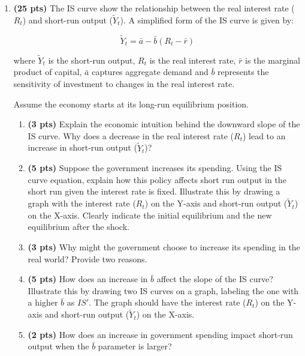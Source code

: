 \documentclass[14pt, oneside]{memoir}
\begin{document}
\begin{enumerate}[label=\textbf{\arabic*.}, itemsep=15pt]
\newpage

\item  \textbf{(25 pts)}\label{P4} The IS curve show the relationship between the real interest rate (\( R_t \)) and short-run output (\( \tilde{Y}_t \)). A simplified form of the IS curve is given by:

\[
\tilde{Y}_t = \bar{a} - \bar{b} (R_t - \bar{r})
\]

where \( \tilde{Y}_t \) is the short-run output, \( R_t \) is the real interest rate, \( \bar{r} \) is the marginal product of capital,  \( \bar{a} \) captures aggregate demand and \( \bar{b} \) represents the sensitivity of investment to changes in the real interest rate.

Assume the economy starts at its long-run equilibrium position.

\begin{enumerate}
	\item \textbf{(3 pts)} Explain the economic intuition behind the downward slope of the IS curve. Why does a decrease in the real interest rate (\( R_t \)) lead to an increase in short-run output (\( \tilde{Y}_t \))?
	
	\clearpage
	
	\item \textbf{(5 pts)} Suppose the government increases its spending. Using the IS curve equation, explain how this policy affects short run output in the short run given the interest rate is fixed. Illustrate this by drawing a graph with the interest rate (\( R_t \)) on the Y-axis and short-run output (\( \tilde{Y}_t \)) on the X-axis. Clearly indicate the initial equilibrium and the new equilibrium after the shock.
	
	\vspace{10cm}
	\item \textbf{(3 pts)} Why might the government choose to increase its spending in the real world? Provide two reasons.
	
	\clearpage
	\item \textbf{(5 pts)} How does an increase in \( \bar{b} \) affect the slope of the IS curve? Illustrate this by drawing two IS curves on a graph, labeling the one with a higher \( \bar{b} \) as \( IS' \). The graph should have the interest rate (\( R_t \)) on the Y-axis and short-run output (\( \tilde{Y}_t \)) on the X-axis.
	
	\vspace{10cm}
	\item \textbf{(2 pts)} How does an increase in government spending impact short-run output when the \( \bar{b} \) parameter is larger?
	

\end{enumerate}
\end{enumerate}
\end{document}
